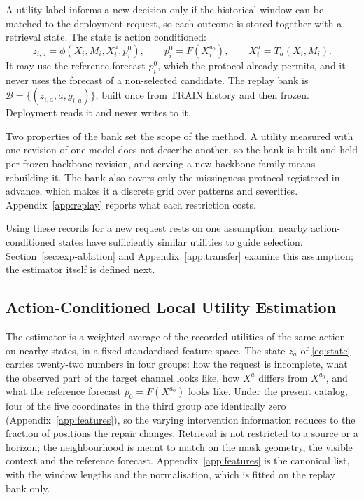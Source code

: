 \documentclass{article}
\newcommand{\calB}{\mathcal{B}}
\begin{document}
A utility label informs a new decision only if the historical window can be matched to the
deployment request, so each outcome is stored together with a retrieval state. The state is
action conditioned:
\begin{equation}
  z_{i,a} = \phi(X_i, M_i, X_i^{a}, p_i^{0}),
  \qquad p_i^{0} = F(X_i^{a_0}),
  \qquad X_i^{a} = T_a(X_i, M_i).
  \label{eq:state}
\end{equation}
It may use the reference forecast $p_i^0$, which the
protocol already permits, and it never uses the forecast of a non-selected candidate. The
replay bank is $\calB = \{(z_{i,a}, a, g_{i,a})\}$, built once from TRAIN history and then
frozen. Deployment reads it and never writes to it.

Two properties of the bank set the scope of the method. A utility measured with one revision
of one model does not describe another, so the bank is built and held per frozen backbone
revision, and serving a new backbone family means rebuilding it. The bank also covers only the
missingness protocol registered in advance, which makes it a discrete grid over patterns and
severities.
Appendix~\ref{app:replay} reports what each restriction costs.

Using these records for a new request rests on one assumption: nearby action-conditioned
states have sufficiently similar utilities to guide selection. Section~\ref{sec:exp-ablation}
and Appendix~\ref{app:transfer} examine this assumption; the estimator itself is defined next.

\subsection{Action-Conditioned Local Utility Estimation}
\label{sec:method-scoring}
The estimator is a weighted average of the recorded utilities of the same action on nearby
states, in a fixed standardised feature space. The state $z_a$ of \eqref{eq:state} carries
twenty-two numbers in four groups: how the request is incomplete, what the observed part of the
target channel looks like, how $X^{a}$ differs from $X^{a_0}$, and what the reference forecast
$p_0 = F(X^{a_0})$ looks like. Under the present catalog, four of the five coordinates in the
third group are identically zero (Appendix~\ref{app:features}), so the varying intervention
information reduces to the fraction of positions the repair changes. Retrieval is not
restricted to a source or a horizon; the neighbourhood is meant to match on the mask geometry,
the visible context and the reference forecast. Appendix~\ref{app:features} is the canonical
list, with the window lengths and the normalisation, which is fitted on the replay bank only.
\end{document}
